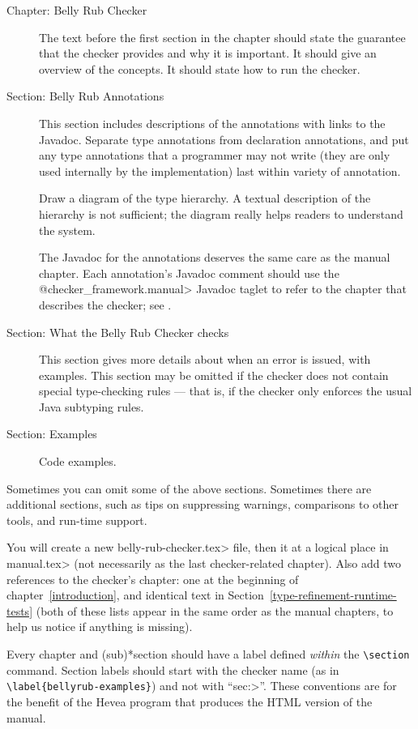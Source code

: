 \begin{description}
\item[Chapter: Belly Rub Checker]
  The text before the first section in the chapter should state the
  guarantee that the checker provides and why it is important.  It should
  give an overview of the concepts.  It should state how to run the checker.
\item[Section: Belly Rub Annotations]
  This section includes descriptions of the annotations with links to the
  Javadoc.  Separate type annotations from declaration annotations, and put
  any type annotations that a programmer may not write (they are only used
  internally by the implementation) last within variety of annotation.

  Draw a diagram of the type hierarchy.  A textual description of
  the hierarchy is not sufficient; the diagram really helps readers to
  understand the system.

  The Javadoc for the annotations deserves the same care as the manual
  chapter.  Each annotation's Javadoc comment should use the
  \<@checker\_framework.manual> Javadoc taglet to refer to the chapter that
  describes the checker; see .
\item[Section: What the Belly Rub Checker checks]
  This section gives more details about when an error is issued, with examples.
  This section may be omitted if the checker does not contain special
  type-checking rules --- that is, if the checker only enforces the usual
  Java subtyping rules.
\item[Section: Examples]
  Code examples.
\end{description}

Sometimes you can omit some of the above sections.  Sometimes there are
additional sections, such as tips on suppressing warnings, comparisons to
other tools, and run-time support.

You will create a new \<belly-rub-checker.tex> file,
then \verb|| it at a logical place in \<manual.tex> (not
necessarily as the last checker-related chapter).  Also add two references
to the checker's chapter:  one at the beginning of
chapter~\ref{introduction}, and identical text in
Section~\ref{type-refinement-runtime-tests} (both of these lists appear in
the same order as the manual chapters, to help us notice if anything is
missing).

Every chapter and (sub)*section should have a label defined \emph{within} the
\verb|\section| command.  Section labels should start with the checker
name (as in \verb|\label{bellyrub-examples}|) and not with ``\<sec:>''.
These conventions are for the benefit of the Hevea program that produces
the HTML version of the manual.

